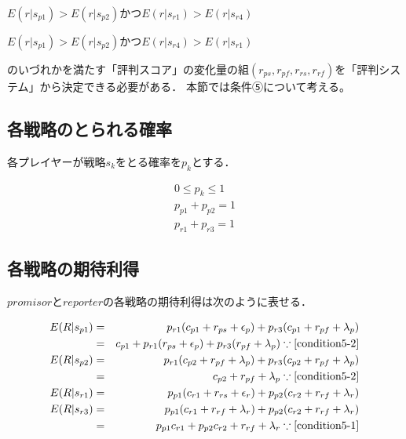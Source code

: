 \begin{description}
  \centering
  \item[条件⑤] $E(r|s_{p1}) > E(r|s_{p2})$かつ$E(r|s_{r1}) > E(r|s_{r4})$
  \item[条件⑥] $E(r|s_{p1}) > E(r|s_{p2})$かつ$E(r|s_{r4}) > E(r|s_{r1})$ 
\end{description}

のいづれかを満たす「評判スコア」の変化量の組$(r_{ps}, r_{pf}, r_{rs}, r_{rf})$を「評判システム」から決定できる必要がある．
本節では条件⑤について考える。

\subsection{各戦略のとられる確率}
各プレイヤーが戦略$s_{k}$をとる確率を$p_{k}$とする．

\begin{gather}
  0 \leq p_{k} \leq 1 \nonumber \\
  p_{p1} + p_{p2} = 1 \label{condition5-1} \\
  p_{r1} + p_{r3} = 1 \label{condition5-2}
\end{gather}

\subsection{各戦略の期待利得}
$promisor$と$reporter$の各戦略の期待利得は次のように表せる．

\begin{eqnarray}
  E(R|s_{p1}) &=& p_{r1} (c_{p1} + r_{ps} + \epsilon_p) + p_{r3} (c_{p1} + r_{pf} + \lambda_p) \nonumber \\
              &=& c_{p1} + p_{r1} (r_{ps} + \epsilon_p) + p_{r3} (r_{pf} + \lambda_p) \because\eqref{condition5-2} \\
  E(R|s_{p2}) &=& p_{r1} (c_{p2} + r_{pf} + \lambda_p) + p_{r3} (c_{p2} + r_{pf} + \lambda_p) \nonumber \\
              &=& c_{p2} + r_{pf} + \lambda_p  \because\eqref{condition5-2} \\
  E(R|s_{r1}) &=& p_{p1} (c_{r1} + r_{rs} + \epsilon_r) + p_{p2} (c_{r2} + r_{rf} + \lambda_r) \\
  E(R|s_{r3}) &=& p_{p1} (c_{r1} + r_{rf} + \lambda_r) + p_{p2} (c_{r2} + r_{rf} + \lambda_r) \nonumber \\
              &=& p_{p1} c_{r1} + p_{p2} c_{r2} + r_{rf} + \lambda_r \because\eqref{condition5-1}
\end{eqnarray}

